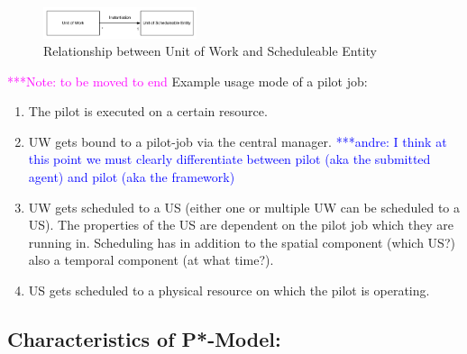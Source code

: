 \documentclass[conference,final]{IEEEtran}
\newcommand{\alnote}[1]{ {\textcolor{blue} { ***andre: #1 }}}
\newcommand{\note}[1]{ {\textcolor{magenta} { ***Note: #1 }}}
\newcommand{\alnote}[1]{}
\newcommand{\note}[1]{}
\begin{document}
\begin{figure}[htbp]
    \centering    
    \includegraphics[width=0.4\textwidth]{figures/task-job.pdf}
    \caption{Relationship between Unit of Work and Scheduleable Entity}
    \label{fig:figures_task-job1}
\end{figure}    

\note{to be moved to end}
\noindent
Example usage mode of a pilot job:
\begin{enumerate}
    \item The pilot is executed on a certain resource.
    \item UW gets bound to a pilot-job via the central manager. 
    \alnote{I think at this point we must 
    clearly differentiate between pilot (aka the submitted agent) and pilot (aka 
    the framework)}
    \item UW gets scheduled to a US  (either one or multiple UW can be 
     scheduled to a US). The properties of the US are dependent on the pilot job 
     which they are running in. Scheduling has in addition to the spatial 
     component (which US?) also a temporal component (at what time?).
    \item US gets scheduled to a physical resource on which the pilot is 
     operating.
\end{enumerate}


% 
% 


\subsection{Characteristics of P*-Model:}
\label{sec:p_star_elements}
\end{document}
